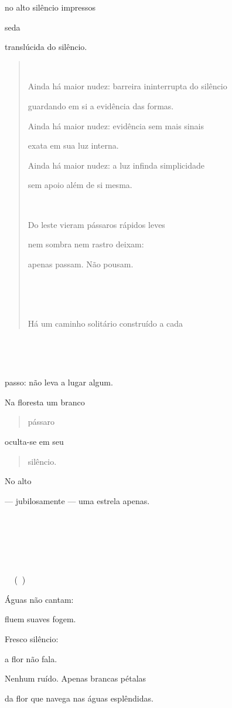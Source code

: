 no alto silêncio impressos

seda

translúcida do silêncio.

\begin{quote}


Ainda há maior nudez: barreira ininterrupta do silêncio

guardando em si a evidência das formas.

Ainda há maior nudez: evidência sem mais sinais

exata em sua luz interna.

Ainda há maior nudez: a luz infinda simplicidade

sem apoio além de si mesma.



Do leste vieram pássaros rápidos leves

nem sombra nem rastro deixam:

apenas passam. Não pousam.





Há um caminho solitário construído a cada
\end{quote}





passo: não leva a lugar algum.

Na floresta um branco

\begin{quote}
pássaro
\end{quote}

oculta-se em seu

\begin{quote}
silêncio.
\end{quote}

No alto

--- jubilosamente --- uma estrela apenas.







 ()

Águas não cantam:

fluem suaves fogem.

Fresco silêncio:

a flor não fala.

Nenhum ruído. Apenas brancas pétalas

da flor que navega nas águas esplêndidas.


